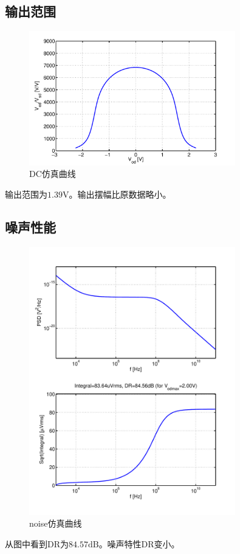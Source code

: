 \documentclass[a4paper]{article}
\newcommand{\uV}{\si{\volt}}
\newcommand{\udB}{\si{\deci\bel}}
\begin{document}
\subsection{输出范围}
\begin{figure}[htb]
    \begin{center}
        \includegraphics[width=0.8\textwidth]{slow/dc.pdf}
    \end{center}
    \caption{DC仿真曲线}
    \label{slowdc}
\end{figure}
输出范围为$1.39\uV$。输出摆幅比原数据略小。
\newpage
\clearpage
\subsection{噪声性能}
\begin{figure}[htb]
    \begin{center}
        \includegraphics[width=0.8\textwidth]{slow/noise.pdf}
    \end{center}
    \caption{noise仿真曲线}
    \label{slownoise}
\end{figure}
从图中看到DR为$84.57\udB$。噪声特性DR变小。
\newpage
\clearpage
\end{document}
